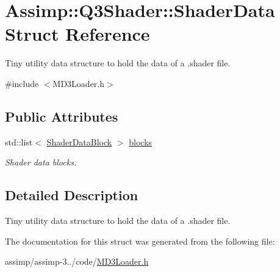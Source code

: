 \hypertarget{struct_assimp_1_1_q3_shader_1_1_shader_data}{\section{Assimp\+:\+:Q3\+Shader\+:\+:Shader\+Data Struct Reference}
\label{struct_assimp_1_1_q3_shader_1_1_shader_data}
}


Tiny utility data structure to hold the data of a .shader file.  




{\ttfamily \#include $<$M\+D3\+Loader.\+h$>$}

\subsection*{Public Attributes}
\begin{DoxyCompactItemize}
\item 
\hypertarget{struct_assimp_1_1_q3_shader_1_1_shader_data_a6dbe2a7c0b44535c7beb05d28bcc4717}{std\+::list$<$ \hyperlink{struct_assimp_1_1_q3_shader_1_1_shader_data_block}{Shader\+Data\+Block} $>$ \hyperlink{struct_assimp_1_1_q3_shader_1_1_shader_data_a6dbe2a7c0b44535c7beb05d28bcc4717}{blocks}}\label{struct_assimp_1_1_q3_shader_1_1_shader_data_a6dbe2a7c0b44535c7beb05d28bcc4717}

\begin{DoxyCompactList}\small\item\em Shader data blocks. \end{DoxyCompactList}\end{DoxyCompactItemize}


\subsection{Detailed Description}
Tiny utility data structure to hold the data of a .shader file. 

The documentation for this struct was generated from the following file\+:\begin{DoxyCompactItemize}
\item 
assimp/assimp-\/3../code/\hyperlink{_m_d3_loader_8h}{M\+D3\+Loader.\+h}\end{DoxyCompactItemize}
